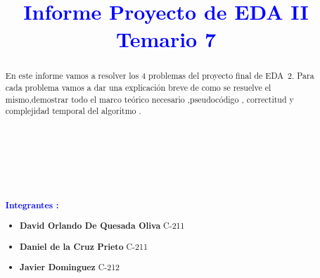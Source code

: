 \documentclass{article}
\begin{document}
    \title{\textcolor{blue}{\textbf{Informe Proyecto de EDA II \\Temario 7}}\\}
    
    \date{} 
    \maketitle  

    \begin{abstract}
        \noindent En este informe  vamos a resolver los 4 problemas del proyecto final de 
        EDA~2. Para cada problema vamos a dar  una explicaci\'on breve de como se resuelve el mismo,demostrar todo el marco te\'orico necesario 
        ,pseudoc\'odigo , correctitud y complejidad temporal del algoritmo . \\\\
        \\\\
        \\\\
        \\\\
        {\large{ \textcolor{blue}{\textbf{Integrantes :}}}}
        \begin{itemize}
            \item \textbf{David Orlando De Quesada Oliva}  C-211
            \item \textbf{Daniel de la Cruz Prieto} C-211
            \item \textbf{Javier Dominguez} C-212
        \end{itemize}
       
    \end{abstract}
\end{document}

